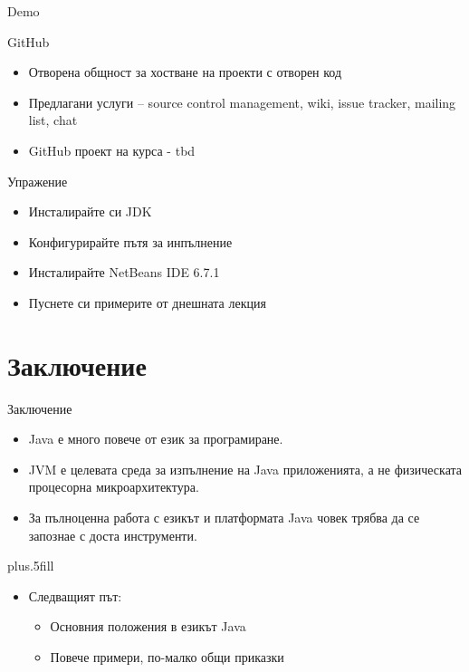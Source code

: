\documentclass{beamer}
\begin{document}
\begin{frame}{Demo}
  
\end{frame}


\begin{frame}{GitHub}
  
  \begin{itemize}
    \item Отворена общност за хостване на
    проекти с отворен код
    \item Предлагани услуги – source control
    management, wiki, issue tracker, mailing
    list, chat

    \item GitHub проект на курса - tbd
  \end{itemize}

\end{frame}

\begin{frame}{Упражение}
  
  \begin{itemize}
    \item Инсталирайте си JDK
    \item Конфигурирайте пътя за инпълнение
    \item Инсталирайте NetBeans IDE 6.7.1
    \item Пуснете си примерите от днешната
    лекция

  \end{itemize}

\end{frame}

\section*{Заключение}

\begin{frame}{Заключение}

  \begin{itemize}
  \item
    Java \alert{е много повече от език за програмиране}.
  \item
    JVM \alert{е целевата среда за изпълнение} на Java приложенията, а
    не физическата процесорна микроархитектура.
  \item
    За пълноценна работа с езикът и платформата Java човек трябва да
    се запознае с доста инструменти.
  \end{itemize}
  
  \vskip0pt plus.5fill
  \begin{itemize}
  \item
    Следващият път:
    \begin{itemize}
    \item
      Основния положения в езикът Java
    \item
      Повече примери, по-малко общи приказки
    \end{itemize}
  \end{itemize}
\end{frame}
\end{document}
